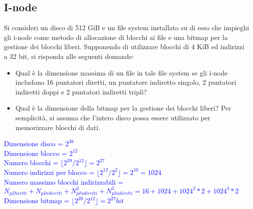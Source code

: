 \documentclass[12pt]{article}
\begin{document}
\subsection{I-node}
Si consideri un disco di 512 GiB e un file system installato su di esso che impieghi gli i-node come
metodo di allocazione di blocchi ai file e una bitmap per la gestione dei blocchi liberi.
Supponendo di utilizzare blocchi di 4 KiB ed indirizzi a 32 bit, si risponda alle seguenti domande:
\begin{itemize}
    \item Qual è la dimensione massima di un file in tale file system se gli i-node includono 16
    puntatori diretti, un puntatore indiretto singolo, 2 puntatori indiretti doppi e 2 puntatori
    indiretti tripli?
    \item Qual è la dimensione della bitmap per la gestione dei blocchi liberi? Per semplicità, si
    assuma che l'intero disco possa essere utilizzato per memorizzare blocchi di dati.
\end{itemize}
\textcolor{blue}{
    Dimensione disco = $2^{39}$\\
    Dimensione blocco = $2^{12}$\\
    Numero blocchi = $\lfloor2^{39}/2^{12}\rfloor=2^{27}$\\
    Numero indirizzi per blocco = $\lfloor2^{12}/2^2\rfloor=2^{10}=1024$\\
    Numero massimo blocchi indirizzabili = $N_{pDiretti}+N_{pIndiretti}+N_{pIndiretti}^2+N_{pIndiretti}^3=16+1024+1024^2*2+1024^3*2$\\
    Dimensione bitmap = $\lfloor2^{39}/2^{12}\rfloor=2^{27}bit$
}
\end{document}
